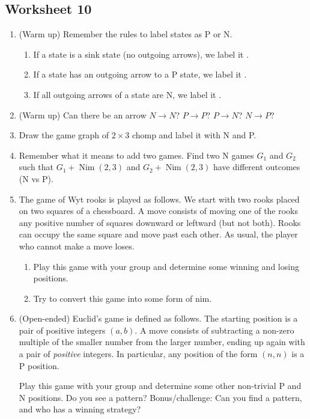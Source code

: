 \documentclass{amsart}
\begin{document}
\subsection{Worksheet 10}
\label{sec:org6af1cdf}
\togglefalse{solutions}

\begin{enumerate}
\item (Warm up) Remember the rules to label states as P or N.
\begin{enumerate}
\item If a state is a sink state (no outgoing arrows), we label it \makebox[3em]{\hrulefill}.
\item If a state has an outgoing arrow to a P state, we label it \makebox[3em]{\hrulefill}.
\item If all outgoing arrows of a state are N, we label it \makebox[3em]{\hrulefill}.
\end{enumerate}

\item (Warm up) Can there be an arrow \(N \to N\)? \(P \to P\)? \(P \to N\)? \(N \to P\)?

\item Draw the game graph of \(2 \times 3\) chomp and label it with N and P.

\item Remember what it means to add two games.
Find two N games \(G_1\) and \(G_2\) such that \(G_1 + \operatorname{Nim}(2,3)\) and \(G_2 + \operatorname{Nim}(2,3)\) have different outcomes (N vs P).

\item The game of Wyt rooks is played as follows.
We start with two rooks placed on two squares of a chessboard.
A move consists of moving one of the rooks any positive number of squares downward or leftward (but not both).
Rooks can occupy the same square and move past each other.
As usual, the player who cannot make a move loses.

\begin{enumerate}
\item Play this game with your group and determine some winning and losing positions.

\item Try to convert this game into some form of nim.
\end{enumerate}

\item (Open-ended) Euclid's game is defined as follows.
The starting position is a pair of positive integers \((a,b)\). A move consists of subtracting a non-zero multiple of the smaller number from the larger number, ending up again with a pair of \emph{positive} integers. In particular, any position of the form \((n,n)\) is a P position.

Play this game with your group and determine some other non-trivial P and N positions. Do you see a pattern? Bonus/challenge: Can you find a pattern, and who has a winning strategy?
\end{enumerate}
\end{document}

